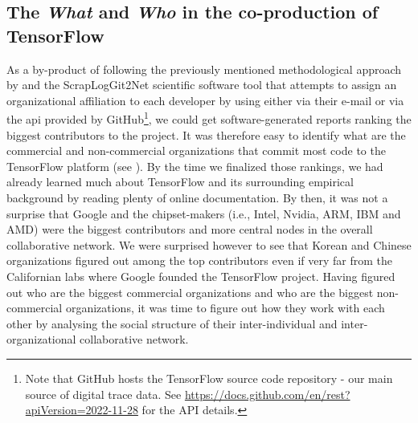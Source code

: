 \documentclass[CHICAGO,Times1COL]{WileyNJDv5} %
\begin{document}
 




\subsection{The \textit{What} and \textit{Who} in the co-production of TensorFlow} 

As a by-product of following the previously mentioned methodological approach by \citet{teixeira2015lessons} and the ScrapLogGit2Net scientific software tool that attempts to assign an organizational affiliation to each developer by using either via their e-mail or via the \ac{api} provided by GitHub\footnote{Note that GitHub hosts the TensorFlow source code repository - our main source of digital trace data. See  \href{https://docs.github.com/en/rest?apiVersion=2022-11-28}{https://docs.github.com/en/rest?apiVersion=2022-11-28} for the API details.}, we could get software-generated reports ranking the biggest contributors to the project. It was therefore easy to identify what are the commercial and non-commercial organizations that commit most code to the TensorFlow platform (see ). By the time we finalized those rankings, 
we had already learned much about TensorFlow and its surrounding empirical background by reading plenty of online documentation. By then, it was not a surprise that Google and the chipset-makers (i.e., Intel, Nvidia, ARM, IBM and AMD) were the biggest contributors and more central nodes in the overall collaborative network. We were surprised however to see that Korean and Chinese organizations figured out among the top contributors even if very far from the Californian labs where Google founded the TensorFlow project. Having figured out who are the biggest commercial organizations and who are the biggest non-commercial organizations, it was time to figure out how they work with each other by analysing the social structure of their inter-individual and inter-organizational collaborative network. 
\end{document}
